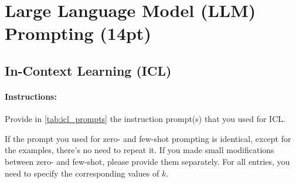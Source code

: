 \documentclass{article}
\begin{document}
\newpage



\section{Large Language Model (LLM) Prompting (14pt)}\label{sec:llm}

\subsection{In-Context Learning (ICL)}\label{sec:llm:icl}

\paragraph{Instructions:} Provide in \autoref{tab:icl_prompts} the instruction prompt(s) that you used for ICL.

If the prompt you used for zero- and few-shot prompting is identical, except for the examples, there's no need to repeat it. 
If you made small modifications between zero- and few-shot, please provide them separately.
For all entries, you need to specify the corresponding values of $k$.
\end{document}
